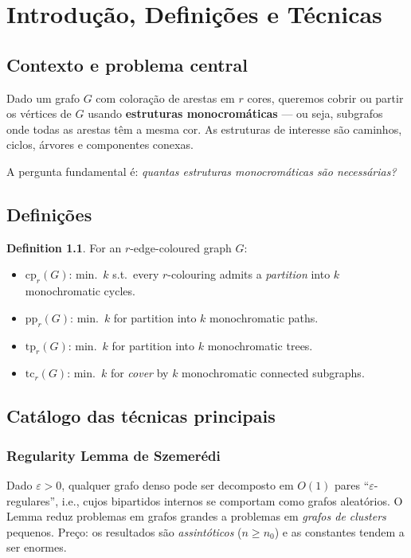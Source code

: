 \documentclass[12pt,a4paper,twoside,openright]{book}
\theoremstyle{definition}
\newtheorem{definition}[theorem]{Definition}
\begin{document}
\mainmatter

\chapter{Introdução, Definições e Técnicas}


\section{Contexto e problema central}

Dado um grafo $G$ com coloração de arestas em $r$ cores, queremos cobrir ou partir os vértices de $G$
usando \textbf{estruturas monocromáticas} — ou seja, subgrafos onde todas as arestas têm a mesma cor.
As estruturas de interesse são caminhos, ciclos, árvores e componentes conexas.

A pergunta fundamental é: \emph{quantas estruturas monocromáticas são necessárias?}

\section{Definições}


\begin{definition}
For an $r$-edge-coloured graph $G$:
\begin{itemize}
  \item $\mathrm{cp}_r(G)$: min.\ $k$ s.t.\ every $r$-colouring admits a \emph{partition} into $k$ monochromatic cycles.
  \item $\mathrm{pp}_r(G)$: min.\ $k$ for partition into $k$ monochromatic paths.
  \item $\mathrm{tp}_r(G)$: min.\ $k$ for partition into $k$ monochromatic trees.
  \item $\mathrm{tc}_r(G)$: min.\ $k$ for \emph{cover} by $k$ monochromatic connected subgraphs.
\end{itemize}
\end{definition}


\section{Catálogo das técnicas principais}

\subsection*{Regularity Lemma de Szemerédi}
Dado $\varepsilon > 0$, qualquer grafo denso pode ser decomposto em $O(1)$ pares ``$\varepsilon$-regulares'',
i.e., cujos bipartidos internos se comportam como grafos aleatórios.
O Lemma reduz problemas em grafos grandes a problemas em \emph{grafos de clusters} pequenos.
Preço: os resultados são \emph{assintóticos} ($n \ge n_0$) e as constantes tendem a ser enormes.
\end{document}
